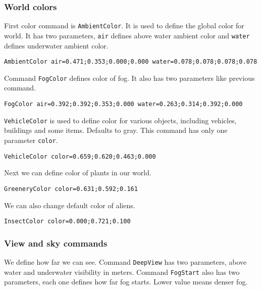 

\subsubsection{World colors}

First color command is \verb|AmbientColor|. It is used to define the global color for world. It has two parameters, \verb|air| defines above water ambient color and \verb|water| defines underwater ambient color.

\begin{lstlisting}[style=scene]
AmbientColor air=0.471;0.353;0.000;0.000 water=0.078;0.078;0.078;0.078
\end{lstlisting}


Command \verb|FogColor| defines color of fog. It also has two parameters like previous command.

\begin{lstlisting}[style=scene]
FogColor air=0.392;0.392;0.353;0.000 water=0.263;0.314;0.392;0.000
\end{lstlisting}

\verb|VehicleColor| is used to define color for various objects, including vehicles, buildings and some items. Defaults to gray. This command has only one parameter \verb|color|.

\begin{lstlisting}[style=scene]
VehicleColor color=0.659;0.620;0.463;0.000
\end{lstlisting}

Next we can define color of plants in our world.

\begin{lstlisting}[style=scene]
GreeneryColor color=0.631;0.592;0.161
\end{lstlisting}

We can also change default color of aliens.

\begin{lstlisting}[style=scene]
InsectColor color=0.000;0.721;0.100
\end{lstlisting}


\subsubsection{View and sky commands}

We define how far we can see. Command \texttt{DeepView} has two parameters, above water and underwater visibility in meters. Command \texttt{FogStart} also has two parameters, each one defines how far fog starts. Lower value means denser fog.

